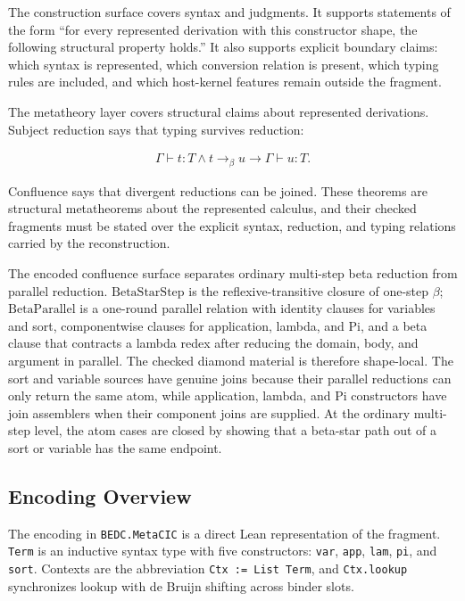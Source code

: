 The construction surface covers syntax and judgments. It supports statements
of the form ``for every represented derivation with this constructor shape, the
following structural property holds.'' It also supports explicit boundary
claims: which syntax is represented, which conversion relation is present,
which typing rules are included, and which host-kernel features remain outside
the fragment.

The metatheory layer covers structural claims about represented derivations.
Subject reduction says that typing survives reduction:

$$
\begin{aligned}
\Gamma \vdash t : T \wedge t \to_{\beta} u
  \longrightarrow \Gamma \vdash u : T.
\end{aligned}
$$

Confluence says that divergent reductions can be joined. These theorems are
structural metatheorems about the represented calculus, and their checked
fragments must be stated over the explicit syntax, reduction, and typing
relations carried by the reconstruction.

The encoded confluence surface separates ordinary multi-step beta reduction
from parallel reduction. $\mathrm{BetaStarStep}$ is the reflexive-transitive
closure of one-step $\beta$; $\mathrm{BetaParallel}$ is a one-round parallel
relation with identity clauses for variables and sort, componentwise clauses
for application, lambda, and Pi, and a beta clause that contracts a lambda
redex after reducing the domain, body, and argument in parallel.
The checked diamond material is therefore shape-local. The sort and variable
sources have genuine joins because their parallel reductions can only return
the same atom, while application, lambda, and Pi constructors have join
assemblers when their component joins are supplied. At the ordinary multi-step
level, the atom cases are closed by showing that a beta-star path out of a
sort or variable has the same endpoint.

\subsection{Encoding Overview}\label{subsec:reconstruction-encoding-overview}

The encoding in \texttt{BEDC.MetaCIC} is a direct Lean representation of the
fragment. \texttt{Term} is an inductive syntax type with five constructors:
\texttt{var}, \texttt{app}, \texttt{lam}, \texttt{pi}, and \texttt{sort}.
Contexts are the abbreviation \texttt{Ctx := List Term}, and
\texttt{Ctx.lookup} synchronizes lookup with de Bruijn shifting across binder
slots.

